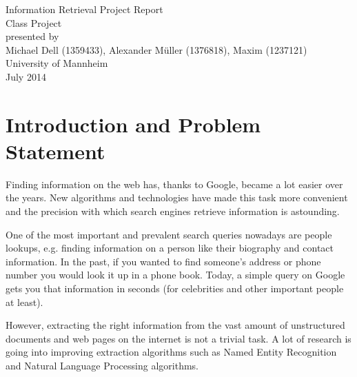 \documentclass[11pt,titlepage,oneside,openany]{article}
\begin{document}
\begin{titlepage}
	\vspace*{2cm}
  \begin{center}
   {\Large Information Retrieval Project Report \\}
   \vspace{2cm} 
   {Class Project\\}
   \vspace{2cm}
   {presented by\\
    Michael Dell (1359433), Alexander Müller (1376818), Maxim (1237121)  \\
    
   }
   \vspace{1cm} 
   {
    University of Mannheim\\} \vspace{2cm}
   {July 2014}
  \end{center}
\end{titlepage} 

\newpage





\newpage


\section{Introduction and Problem Statement}
Finding information on the web has, thanks to Google, became a lot easier over the years. New algorithms and technologies have made this task more convenient and the precision with which search engines retrieve information is astounding.

One of the most important and prevalent search queries nowadays are people lookups, e.g. finding information on a person like their biography and contact information. In the past, if you wanted to find someone’s address or phone number you would look it up in a phone book. Today, a simple query on Google gets you that information in seconds (for celebrities and other important people at least).

However, extracting the right information from the vast amount of unstructured documents and web pages on the internet is not a trivial task. A lot of research is going into improving extraction algorithms such as Named Entity Recognition and Natural Language Processing algorithms.
\end{document}
